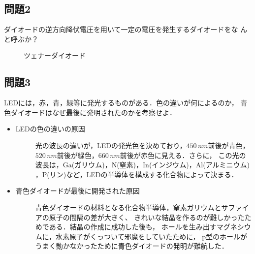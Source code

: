 \subsection*{問題2}
ダイオードの逆方向降伏電圧を用いて一定の電圧を発生するダイオードをな
んと呼ぶか？
\begin{description}
    \item[] ツェナーダイオード
\end{description}

\subsection*{問題3}
LEDには，赤，青，緑等に発光するものがある．色の違いが何によるのか，
青色ダイオードはなぜ最後に発明されたのかを考察せよ．
\begin{itemize}
    \item LEDの色の違いの原因
    \begin{description}
        \item[] 光の波長の違いが，LEDの発光色を決めており，$450\,\si{nm}$前後が青色，
        $520\,\si{nm}$前後が緑色，$660\,\si{nm}$前後が赤色に見える．さらに，
        この光の波長は，Ga(ガリウム)，N(窒素)，In(インジウム)，Al(アルミニウム)
        ，P(リン)など，LEDの半導体を構成する化合物によって決まる．

    \end{description}
    \item 青色ダイオードが最後に開発された原因
    \begin{description}
        \item[] 青色ダイオードの材料となる化合物半導体，窒素ガリウムとサファイアの原子の間隔の差が大きく、
        きれいな結晶を作るのが難しかったためである．結晶の作成に成功した後も，
        ホールを生み出すマグネシウムに，水素原子がくっついて邪魔をしていたために，
        p型のホールがうまく動かなかったために青色ダイオードの発明が難航した．
    \end{description}
\end{itemize}
